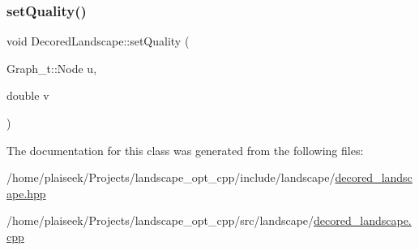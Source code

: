 \mbox{\label{class_decored_landscape_a76d4269a5c48601b0a31dbf91b3cbafe}} 
\subsubsection{\texorpdfstring{set\+Quality()}{setQuality()}}
{\footnotesize\ttfamily void Decored\+Landscape\+::set\+Quality (\begin{DoxyParamCaption}\item[{Graph\+\_\+t\+::\+Node}]{u,  }\item[{double}]{v }\end{DoxyParamCaption})}



The documentation for this class was generated from the following files\+:\begin{DoxyCompactItemize}
\item 
/home/plaiseek/\+Projects/landscape\+\_\+opt\+\_\+cpp/include/landscape/\hyperlink{decored__landscape_8hpp}{decored\+\_\+landscape.\+hpp}\item 
/home/plaiseek/\+Projects/landscape\+\_\+opt\+\_\+cpp/src/landscape/\hyperlink{decored__landscape_8cpp}{decored\+\_\+landscape.\+cpp}\end{DoxyCompactItemize}
